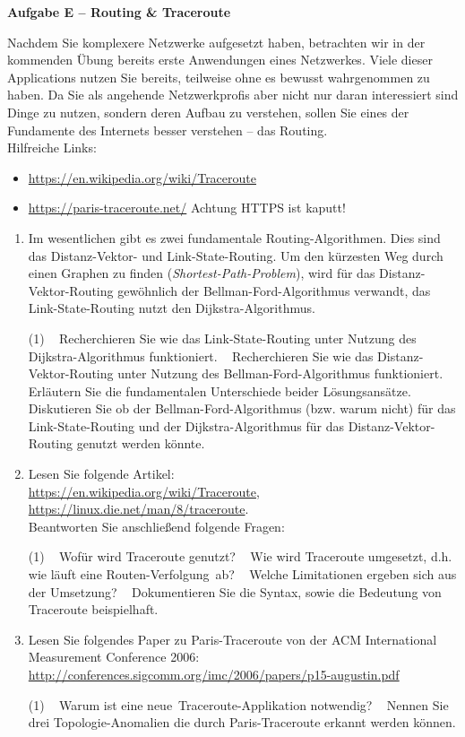 \documentclass[paper=a4,fontsize=11pt]{scrartcl}%
\numberwithin{equation}{section}
\begin{document}
\begin{center}\Large{\textbf{Aufgabe E -- Routing \& Traceroute}}\end{center}\vskip0.25in
Nachdem Sie komplexere Netzwerke aufgesetzt haben, betrachten wir in der kommenden Übung bereits erste Anwendungen eines Netzwerkes. Viele dieser Applications nutzen Sie bereits, teilweise ohne es bewusst wahrgenommen zu haben. Da Sie als angehende Netzwerkprofis aber nicht nur daran interessiert sind Dinge zu nutzen, sondern deren Aufbau zu verstehen, sollen Sie eines der Fundamente des Internets besser verstehen -- das Routing.\\  
Hilfreiche Links:
\begin{itemize}
	\item \url{https://en.wikipedia.org/wiki/Traceroute}
	\item \url{https://paris-traceroute.net/} Achtung HTTPS ist kaputt!
\end{itemize}
\begin{enumerate}
	\item Im wesentlichen gibt es zwei fundamentale Routing-Algorithmen. Dies sind das Distanz-Vektor- und Link-State-Routing. Um den kürzesten Weg durch einen Graphen zu finden (\emph{Shortest-Path-Problem}), wird für das Distanz-Vektor-Routing gewöhnlich der Bellman-Ford-Algorithmus verwandt, das Link-State-Routing nutzt den Dijkstra-Algorithmus.
	\begin{tasks}(1)
		\task~ Recherchieren Sie wie das Link-State-Routing unter Nutzung des Dijkstra-Algorithmus funktioniert.
		\task~ Recherchieren Sie wie das Distanz-Vektor-Routing unter Nutzung des Bellman-Ford-Algorithmus funktioniert.
		\task~ Erläutern Sie die fundamentalen Unterschiede beider Lösungsansätze.
		\task~ Diskutieren Sie ob der Bellman-Ford-Algorithmus (bzw. warum nicht) für das Link-State-Routing und der Dijkstra-Algorithmus für das Distanz-Vektor-Routing genutzt werden könnte.
	\end{tasks}	
	\item Lesen Sie folgende Artikel:\\
	\url{https://en.wikipedia.org/wiki/Traceroute},\\
	\url{https://linux.die.net/man/8/traceroute}.\\
	Beantworten Sie anschließend folgende Fragen:
	\begin{tasks}(1)
		\task~ Wofür wird Traceroute genutzt?
		\task~ Wie wird Traceroute umgesetzt, d.h. wie läuft eine \glqq Routen-Verfolgung\grqq\ ab?
		\task~ Welche Limitationen ergeben sich aus der Umsetzung?
		\task~ Dokumentieren Sie die Syntax, sowie die Bedeutung von Traceroute beispielhaft.
	\end{tasks}
	\item Lesen Sie folgendes Paper zu Paris-Traceroute von der ACM International Measurement Conference 2006:\\
	\url{http://conferences.sigcomm.org/imc/2006/papers/p15-augustin.pdf}
	\begin{tasks}(1)
		\task~ Warum ist eine \glqq neue\grqq\ Traceroute-Applikation notwendig?
		\task~ Nennen Sie drei Topologie-Anomalien die durch Paris-Traceroute erkannt werden können.
	\end{tasks}
\end{enumerate}
\end{document}
